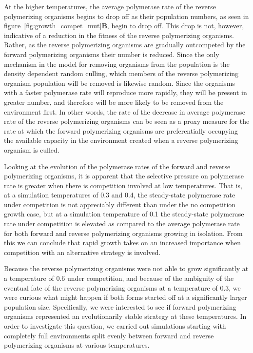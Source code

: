 At the higher temperatures, the average polymerase rate of the reverse polymerizing organisms begins to drop off as their population numbers, as seen in figure~\ref{fig:growth_compet_mut}\textbf{B}, begin to drop off. This drop is not, however, indicative of a reduction in the fitness of the reverse polymerizing organisms. Rather, as the reverse polymerizing organisms are gradually outcompeted by the forward polymerizing organisms their number is reduced. Since the only mechanism in the model for removing organisms from the population is the density dependent random culling, which members of the reverse polymerizing organism population will be removed is likewise random. Since the organisms with a faster polymerase rate will reproduce more rapidly, they will be present in greater number, and therefore will be more likely to be removed from the environment first. In other words, the rate of the decrease in average polymerase rate of the reverse polymerizing organisms can be seen as a proxy measure for the rate at which the forward polymerizing organisms are preferentially occupying the available capacity in the environment created when a reverse polymerizing organism is culled.

Looking at the evolution of the polymerase rates of the forward and reverse polymerizing organisms, it is apparent that the selective pressure on polymerase rate is greater when there is competition involved at low temperatures. That is, at a simulation temperatures of 0.3 and 0.4, the steady-state polymerase rate under competition is not appreciably different than under the no competition growth case, but at a simulation temperature of 0.1 the steady-state polymerase rate under competition is elevated as compared to the average polymerase rate for both forward and reverse polymerizing organisms growing in isolation. From this we can conclude that rapid growth takes on an increased importance when competition with an alternative strategy is involved.

Because the reverse polymerizing organisms were not able to grow significantly at a temperature of 0.6 under competition, and because of the ambiguity of the eventual fate of the reverse polymerizing organisms at a temperature of 0.3, we were curious what might happen if both forms started off at a significantly larger population size. Specifically, we were interested to see if forward polymerizing organisms represented an evolutionarily stable strategy at these temperatures\cite[chap. 4]{ANowak:2006p857}. In order to investigate this question, we carried out simulations starting with completely full environments split evenly between forward and reverse polymerizing organisms at various temperatures.

